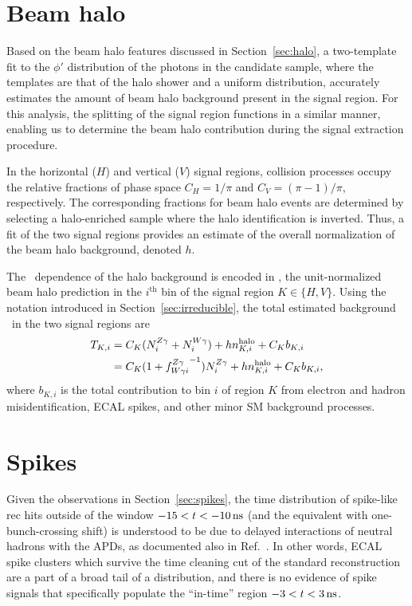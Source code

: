 \section{Beam halo}
\label{sec:halo_estimate}

Based on the beam halo features discussed in Section~\ref{sec:halo}, a two-template fit to the $\phi'$ distribution of the photons in the candidate sample, where the templates are that of the halo shower and a uniform distribution, accurately estimates the amount of beam halo background present in the signal region. 
For this analysis, the splitting of the signal region functions in a similar manner, enabling us to determine the beam halo contribution during the signal extraction procedure.

In the horizontal ($H$) and vertical ($V$) signal regions, collision processes occupy the relative fractions of phase space $C_{H} = 1/\pi$ and $C_{V} = (\pi-1)/\pi$, respectively. 
The corresponding fractions for beam halo events are determined by selecting a halo-enriched sample where the halo identification is inverted. 
Thus, a fit of the two signal regions provides an estimate of the overall normalization of the beam halo background, denoted $h$.
 
The \ETg\ dependence of the halo background is encoded in \nhalo[,i], the unit-normalized beam halo prediction in the $i^\mathrm{th}$ bin of the signal region $K \in \{H,V\}$.
Using the notation introduced in Section~\ref{sec:irreducible}, the total estimated background \TK\ in the two signal regions are
\begin{equation}
\begin{aligned}
  \TK[,i] & = C_{K} (\NZg[i] + \NWg[i]) + h \nhalo[,i] + C_{K} b_{K,i} \\
          & = C_{K} (1 + {\fZW[i]}^{-1}) \NZg[i] + h \nhalo[,i] + C_{K} b_{K,i},
\end{aligned}
\end{equation}
where $b_{K,i}$ is the total contribution to bin $i$ of region $K$ from electron and hadron misidentification, ECAL spikes, and other minor SM background processes.

\section{Spikes}
\label{sec:spike_estimate}

Given the observations in Section~\ref{sec:spikes}, the time distribution of spike-like rec hits outside of the window $-15 < t < -10\ns$ (and the equivalent with one-bunch-crossing shift) is understood to be due to delayed interactions of neutral hadrons with the APDs, as documented also in Ref.~\cite{CMS_AN_2010-357}. 
In other words, ECAL spike clusters which survive the time cleaning cut of the standard reconstruction are a part of a broad tail of a distribution, and there is no evidence of spike signals that specifically populate the ``in-time'' region $-3 < t < 3\ns$.

